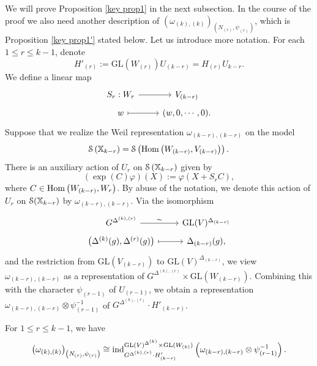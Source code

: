 \documentclass[11pt,reqno]{amsart}
\renewcommand{\1}{{\mathbf{1}}} \newcommand{\sB}{{\mathscr{B}}}
\newcommand{\CS}{{\mathcal {S}}} \newcommand{\CT}{{\mathcal {T}}}
\newcommand{\GL}{{\mathrm{GL}}}\newcommand{\G}{{\mathrm{G}}}
\theoremstyle{plain}
\theoremstyle{definition}
\numberwithin{equation}{section}
\begin{document}
We will prove Proposition \ref{key prop1} in the next subsection. In the course of the proof we also need another description of 
$\left(\omega_{(k),(k)}\right)_{\left(N_{(r)},\psi_{(r)}\right)}$, which is Proposition \ref{key prop1'} stated below. Let us introduce more notation. For each $1\leq r\leq k-1$, denote
$$H'_{(r)}:=\GL(W_{(r)})U_{(k-r)}=H_{(r)}U_{k-r}.$$  
We define a linear map
\begin{equation}\label{equ S_r}\begin{tikzcd}[row sep=0.1cm]
	S_{r}:W_{r} & V_{(k-r)}\\
	w & (w,0,\cdots,0).
	\arrow[ from=1-1, to=1-2]
	\arrow[maps to, from=2-1, to=2-2]
\end{tikzcd}\end{equation}
Suppose that we realize the Weil representation $\omega_{(k-r),(k-r)}$ on the model $$\CS\left(\BX_{k-r}\right)=\CS\left(\Hom\left(W_{(k-r)},V_{(k-r)}\right)\right).$$ There is an auxiliary action of  $U_r$ on  $\CS\left(\BX_{k-r}\right)$ given by
\begin{equation}\label{equ U-action}(\exp(C)\varphi)(X):=\varphi(X+S_rC),\end{equation} 
where  $C\in{\mathrm{Hom}}\left(W_{(k-r)},W_r\right)$.
By abuse of the notation, we denote this action of $U_r$ on $\CS(\BX_{k-r})$ by $\omega_{(k-r),(k-r)}$. 
Via  the isomorphism
\begin{equation}\label{equ gp-isom2}\begin{tikzcd}[row sep=0.1cm]
	{G^{\Delta^{(k),(r)}}} & {\GL(V)^{\Delta_{(k-r)}}} \\
	{\left(\Delta^{(k)}(g),\Delta^{(r)}(g)\right)} & {\Delta_{(k-r)}(g)},
	\arrow["\sim", from=1-1, to=1-2]
	\arrow[maps to, from=2-1, to=2-2]
\end{tikzcd}\end{equation}
and the restriction from $\GL(V_{(k-r)})$ to $\GL(V)^{\Delta_{(k-r)}}$,  we view $\omega_{(k-r),(k-r)}$ as a representation of $G^{\Delta^{(k),(r)}}\times\GL(W_{(k-r)})$. 
Combining this with the character $\psi_{(r-1)}$ of $U_{(r-1)}$, we obtain a representation $\omega_{(k-r),(k-r)}\otimes\psi_{(r-1)}^{-1}$ of $G^{\Delta^{(k),(r)}}\cdot H'_{(k-r)}$.

\begin{prop}\label{key prop1'}
For $1\leq r\leq k-1$, we have
$$\left(\omega_{(k),(k)}\right)_{\left(N_{(r)},\psi_{(r)}\right)}\cong\ind_{G^{\Delta^{(k),(r)}}\cdot H'_{(k-r)}}^{\GL(V)^{\Delta^{(k)}}\times\GL(W_{(k)})}\left(\omega_{(k-r),(k-r)}\otimes\psi_{(r-1)}^{-1}\right).$$
\end{prop}
\end{document}
